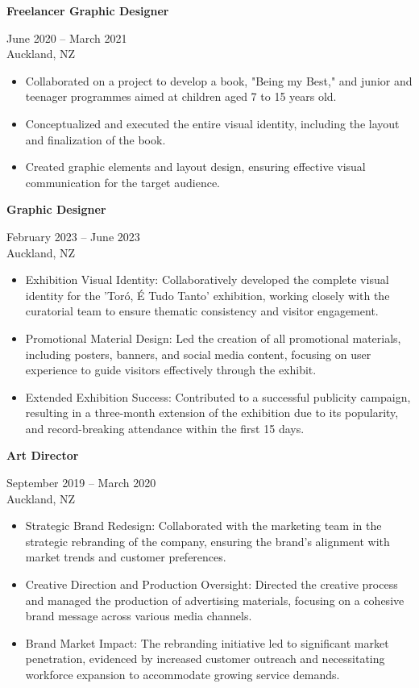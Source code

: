 \documentclass[10pt,a4paper,ragged2e,withhyper]{altacv}
\renewcommand{\cvevent}[4]{%
  \textbf{#1} %
  \hfill %
  \begin{minipage}[t]{.5\linewidth}
    \raggedleft %
    \small#3 %
    \\ %
    #4 %
  \end{minipage}
  \vspace{\baselineskip} %
}
\begin{document}
\divider

\cvevent{Freelancer Graphic Designer}{Sue Lyon}{June 2020 -- March 2021}{Auckland, NZ}
\begin{itemize}
  \item Collaborated on a project to develop a book, "Being my Best," and junior and teenager programmes aimed at children aged 7 to 15 years old.
  \item Conceptualized and executed the entire visual identity, including the layout and finalization of the book.
  \item Created graphic elements and layout design, ensuring effective visual communication for the target audience.
\end{itemize}

\divider

\cvevent{Graphic Designer}{Auckland War Memorial Museum}{February 2023 -- June 2023}{Auckland, NZ}
\begin{itemize}
  \item Exhibition Visual Identity: Collaboratively developed the complete visual identity for the 'Toró, É Tudo Tanto' exhibition, working closely with the curatorial team to ensure thematic consistency and visitor engagement.
  \item Promotional Material Design: Led the creation of all promotional materials, including posters, banners, and social media content, focusing on user experience to guide visitors effectively through the exhibit.
  \item Extended Exhibition Success: Contributed to a successful publicity campaign, resulting in a three-month extension of the exhibition due to its popularity, and record-breaking attendance within the first 15 days.
\end{itemize}

\divider

\cvevent{Art Director}{Clean.com}{September 2019 -- March 2020}{Auckland, NZ}
\begin{itemize}
  \item Strategic Brand Redesign: Collaborated with the marketing team in the strategic rebranding of the company, ensuring the brand's alignment with market trends and customer preferences.
  \item Creative Direction and Production Oversight: Directed the creative process and managed the production of advertising materials, focusing on a cohesive brand message across various media channels.
  \item Brand Market Impact: The rebranding initiative led to significant market penetration, evidenced by increased customer outreach and necessitating workforce expansion to accommodate growing service demands.
\end{itemize}
\end{document}
